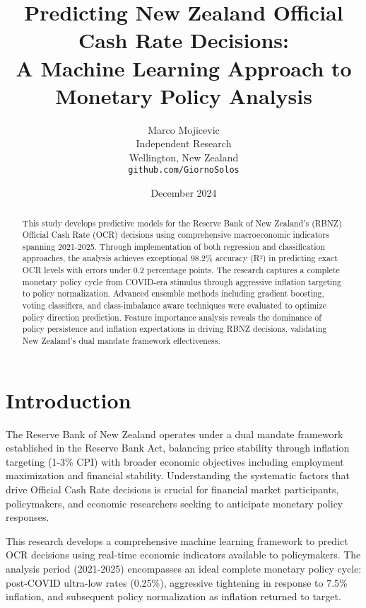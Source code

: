 \documentclass[11pt,a4paper]{article}
\title{Predicting New Zealand Official Cash Rate Decisions: \\
	A Machine Learning Approach to Monetary Policy Analysis}
\author{Marco Mojicevic \\
	Independent Research \\
	Wellington, New Zealand \\
	\texttt{github.com/GiornoSolos}}
\date{December 2024}
\begin{document}
	
	\maketitle
	
	\begin{abstract}
		This study develops predictive models for the Reserve Bank of New Zealand's (RBNZ) Official Cash Rate (OCR) decisions using comprehensive macroeconomic indicators spanning 2021-2025. Through implementation of both regression and classification approaches, the analysis achieves exceptional 98.2\% accuracy (R²) in predicting exact OCR levels with errors under 0.2 percentage points. The research captures a complete monetary policy cycle from COVID-era stimulus through aggressive inflation targeting to policy normalization. Advanced ensemble methods including gradient boosting, voting classifiers, and class-imbalance aware techniques were evaluated to optimize policy direction prediction. Feature importance analysis reveals the dominance of policy persistence and inflation expectations in driving RBNZ decisions, validating New Zealand's dual mandate framework effectiveness.
	\end{abstract}
	
	\section{Introduction}
	
	The Reserve Bank of New Zealand operates under a dual mandate framework established in the Reserve Bank Act, balancing price stability through inflation targeting (1-3\% CPI) with broader economic objectives including employment maximization and financial stability. Understanding the systematic factors that drive Official Cash Rate decisions is crucial for financial market participants, policymakers, and economic researchers seeking to anticipate monetary policy responses.
	
	This research develops a comprehensive machine learning framework to predict OCR decisions using real-time economic indicators available to policymakers. The analysis period (2021-2025) encompasses an ideal complete monetary policy cycle: post-COVID ultra-low rates (0.25\%), aggressive tightening in response to 7.5\% inflation, and subsequent policy normalization as inflation returned to target.
	
\end{document}
